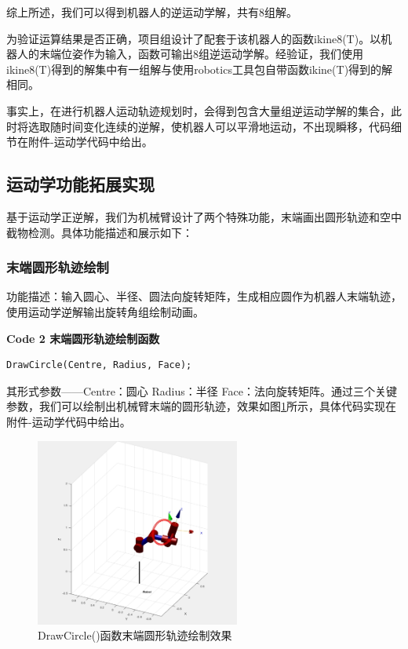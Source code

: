 综上所述，我们可以得到机器人的逆运动学解，共有8组解。

为验证运算结果是否正确，项目组设计了配套于该机器人的函数ikine8(T)。以机器人的末端位姿作为输入，函数可输出8组逆运动学解。经验证，我们使用ikine8(T)得到的解集中有一组解与使用robotics工具包自带函数ikine(T)得到的解相同。

事实上，在进行机器人运动轨迹规划时，会得到包含大量组逆运动学解的集合，此时将选取随时间变化连续的逆解，使机器人可以平滑地运动，不出现瞬移，代码细节在附件-运动学代码中给出。

\subsection{运动学功能拓展实现}
基于运动学正逆解，我们为机械臂设计了两个特殊功能，末端画出圆形轨迹和空中截物检测。具体功能描述和展示如下：

\subsubsection{末端圆形轨迹绘制}
功能描述：输入圆心、半径、圆法向旋转矩阵，生成相应圆作为机器人末端轨迹，使用运动学逆解输出旋转角组绘制动画。

\textbf{Code 2 {\quad} 末端圆形轨迹绘制函数}
\begin{lstlisting}
DrawCircle(Centre, Radius, Face);
\end{lstlisting}

其形式参数——Centre：圆心 Radius：半径 Face：法向旋转矩阵。通过三个关键参数，我们可以绘制出机械臂末端的圆形轨迹，效果如图\ref{fig:16}所示，具体代码实现在附件-运动学代码中给出。

\begin{figure}[htbp]
    \centering
    \includegraphics[width=0.6\textwidth]{Image/fig26.jpg}
    \caption{DrawCircle()函数末端圆形轨迹绘制效果}
    \label{fig:16}
\end{figure}
